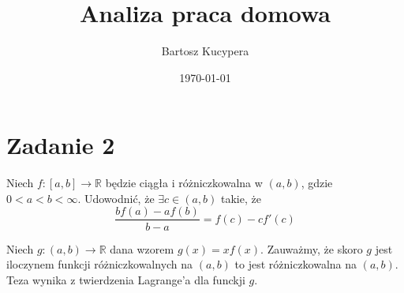 \documentclass{article}
\title{Analiza praca domowa}
\author{Bartosz Kucypera}
\date{\today}
\begin{document}
\maketitle

\section*{Zadanie 2} 

Niech $f : [a,b] \rightarrow \mathbb{R}$ będzie ciągła i różniczkowalna w $(a,b)$, gdzie $ 0 < a < b < \infty$. \newline
Udowodnić, że $\exists c \in (a, b)$ takie, że 
$$ \frac{bf(a) - af(b)}{b-a} = f(c) - cf'(c) $$

Niech $g:(a, b) \rightarrow \mathbb{R}$ dana wzorem $g(x) = xf(x)$.
Zauważmy, że skoro $g$ jest iloczynem funkcji różniczkowalnych na $(a,b)$ to jest różniczkowalna na $(a, b)$. Teza wynika z twierdzenia Lagrange'a dla funckji $g$.
\end{document}
